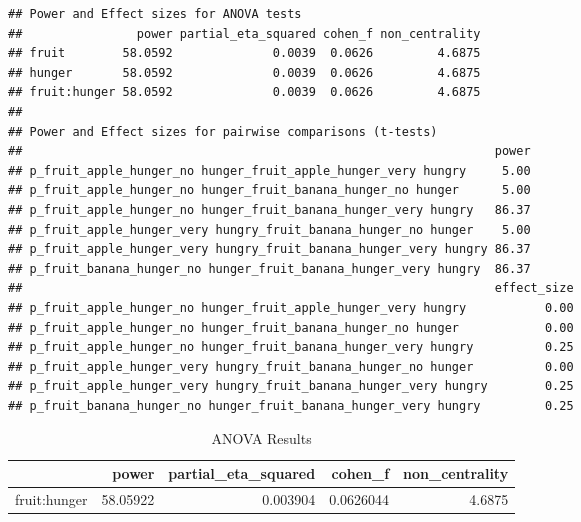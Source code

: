 \documentclass[
]{book}
\newenvironment{Shaded}{\begin{snugshade}}{\end{snugshade}}
\newcommand{\AttributeTok}[1]{\textcolor[rgb]{0.77,0.63,0.00}{#1}}
\newcommand{\DecValTok}[1]{\textcolor[rgb]{0.00,0.00,0.81}{#1}}
\newcommand{\FunctionTok}[1]{\textcolor[rgb]{0.00,0.00,0.00}{#1}}
\newcommand{\NormalTok}[1]{#1}
\newcommand{\SpecialCharTok}[1]{\textcolor[rgb]{0.00,0.00,0.00}{#1}}
\newcommand{\StringTok}[1]{\textcolor[rgb]{0.31,0.60,0.02}{#1}}
\begin{document}
\begin{verbatim}
## Power and Effect sizes for ANOVA tests
##                power partial_eta_squared cohen_f non_centrality
## fruit        58.0592              0.0039  0.0626         4.6875
## hunger       58.0592              0.0039  0.0626         4.6875
## fruit:hunger 58.0592              0.0039  0.0626         4.6875
## 
## Power and Effect sizes for pairwise comparisons (t-tests)
##                                                                  power
## p_fruit_apple_hunger_no hunger_fruit_apple_hunger_very hungry     5.00
## p_fruit_apple_hunger_no hunger_fruit_banana_hunger_no hunger      5.00
## p_fruit_apple_hunger_no hunger_fruit_banana_hunger_very hungry   86.37
## p_fruit_apple_hunger_very hungry_fruit_banana_hunger_no hunger    5.00
## p_fruit_apple_hunger_very hungry_fruit_banana_hunger_very hungry 86.37
## p_fruit_banana_hunger_no hunger_fruit_banana_hunger_very hungry  86.37
##                                                                  effect_size
## p_fruit_apple_hunger_no hunger_fruit_apple_hunger_very hungry           0.00
## p_fruit_apple_hunger_no hunger_fruit_banana_hunger_no hunger            0.00
## p_fruit_apple_hunger_no hunger_fruit_banana_hunger_very hungry          0.25
## p_fruit_apple_hunger_very hungry_fruit_banana_hunger_no hunger          0.00
## p_fruit_apple_hunger_very hungry_fruit_banana_hunger_very hungry        0.25
## p_fruit_banana_hunger_no hunger_fruit_banana_hunger_very hungry         0.25
\end{verbatim}

\begin{Shaded}
\end{Shaded}

\begin{table}[!h]

\caption{\label{tab:unnamed-chunk-229}ANOVA Results}
\centering
\begin{tabular}[t]{l|r|r|r|r}
\hline
  & power & partial\_eta\_squared & cohen\_f & non\_centrality\\
\hline
fruit:hunger & 58.05922 & 0.003904 & 0.0626044 & 4.6875\\
\hline
\end{tabular}
\end{table}
\end{document}
